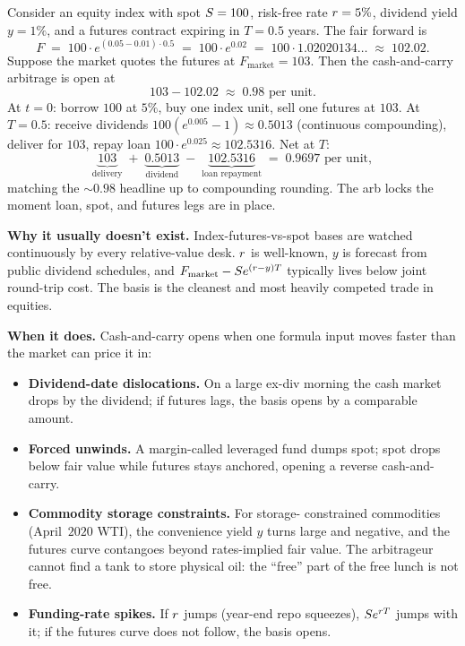 Consider an equity index with spot $S = 100$, risk-free rate
$r = 5\%$, dividend yield $y = 1\%$, and a futures contract
expiring in $T = 0.5$ years. The fair forward is
\begin{equation*}
  F \;=\; 100 \cdot e^{(0.05 - 0.01) \cdot 0.5}
  \;=\; 100 \cdot e^{0.02}
  \;=\; 100 \cdot 1.02020134\ldots
  \;\approx\; 102.02.
\end{equation*}
Suppose the market quotes the futures at $F_{\text{market}} =
103$. Then the cash-and-carry arbitrage is open at
\begin{equation*}
  103 - 102.02 \;\approx\; 0.98 \text{ per unit}.
\end{equation*}
At $t=0$: borrow $100$ at $5\%$, buy one index unit, sell one
futures at $103$. At $T=0.5$: receive dividends
$100(e^{0.005}-1) \approx 0.5013$ (continuous compounding),
deliver for $103$, repay loan $100 \cdot e^{0.025} \approx
102.5316$. Net at $T$:
\begin{equation*}
  \underbrace{103}_{\text{delivery}}
  \;+\;
  \underbrace{0.5013}_{\text{dividend}}
  \;-\;
  \underbrace{102.5316}_{\text{loan repayment}}
  \;=\;
  0.9697 \text{ per unit},
\end{equation*}
matching the $\sim 0.98$ headline up to compounding rounding.
The arb locks the moment loan, spot, and futures legs are in
place.

\textbf{Why it usually doesn't exist.} Index-futures-vs-spot
bases are watched continuously by every relative-value desk.
$r$ is well-known, $y$ is forecast from public dividend
schedules, and $F_{\text{market}} - S e^{(r - y)T}$
typically lives below joint round-trip cost. The basis is the
cleanest and most heavily competed trade in equities.

\textbf{When it does.} Cash-and-carry opens when one formula
input moves faster than the market can price it in:
\begin{itemize}
  \item \textbf{Dividend-date dislocations.} On a large ex-div
  morning the cash market drops by the dividend; if futures
  lags, the basis opens by a comparable amount.
  \item \textbf{Forced unwinds.} A margin-called leveraged fund
  dumps spot; spot drops below fair value while futures stays
  anchored, opening a reverse cash-and-carry.
  \item \textbf{Commodity storage constraints.} For storage-
  constrained commodities (April~$2020$ WTI), the convenience
  yield $y$ turns large and negative, and the futures curve
  contangoes beyond rates-implied fair value. The arbitrageur
  cannot find a tank to store physical oil: the ``free''
  part of the free lunch is not free.
  \item \textbf{Funding-rate spikes.} If $r$ jumps
  (year-end repo squeezes), $S e^{r T}$ jumps with it; if
  the futures curve does not follow, the basis opens.
\end{itemize}

